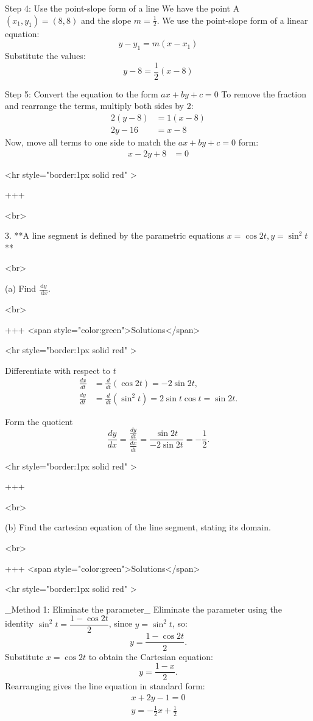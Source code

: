 Step 4: Use the point-slope form of a line
We have the point A $(x_1, y_1) = (8, 8)$ and the slope $m = \frac{1}{2}$. We use the point-slope form of a linear equation:
$$ y - y_1 = m(x - x_1) $$
Substitute the values:
$$ y - 8 = \frac{1}{2}(x - 8) $$

Step 5: Convert the equation to the form $ax + by + c = 0$
To remove the fraction and rearrange the terms, multiply both sides by 2:
\begin{align*} 2(y - 8) &= 1(x - 8) \\ 2y - 16 &= x - 8 \end{align*}
Now, move all terms to one side to match the $ax + by + c = 0$ form:
\begin{align*} x - 2y + 8 &= 0 \end{align*}

<hr style="border:1px solid red" >

+++

<br>


3. **A line segment is defined by the parametric equations $x=\cos 2 t, y=\sin ^{2} t$**

<br>

(a) Find $\frac{\mathrm{d} y}{\mathrm{~d} x}$.

<br>

+++ <span style="color:green">Solutions</span>

<hr style="border:1px solid red" >

Differentiate with respect to $t$
\begin{align*}
\frac{dx}{dt} &= \frac{d}{dt}(\cos 2t) = -2\sin 2t, \\
\frac{dy}{dt} &= \frac{d}{dt}(\sin^2 t) = 2\sin t\cos t = \sin 2t.
\end{align*}

Form the quotient
$$
\frac{dy}{dx} = \frac{\displaystyle\frac{dy}{dt}}{\displaystyle\frac{dx}{dt}}
= \frac{\sin 2t}{-2\sin 2t} = -\frac{1}{2}.
$$

<hr style="border:1px solid red" >

+++

<br>


(b) Find the cartesian equation of the line segment, stating its domain.

<br>

+++ <span style="color:green">Solutions</span>

<hr style="border:1px solid red" >

_Method 1: Eliminate the parameter_
Eliminate the parameter using the identity $\sin^2 t = \dfrac{1-\cos 2t}{2}$, since $y=\sin^2 t$, so:
$$
y = \frac{1-\cos 2t}{2}.
$$
Substitute $x=\cos 2t$ to obtain the Cartesian equation:
$$
y = \frac{1-x}{2}.
$$
Rearranging gives the line equation in standard form:
$$
\begin{align*}
x + 2y - 1 = 0\\
y = -\frac{1}{2}x  + \frac{1}{2}
\end{align*}
$$

